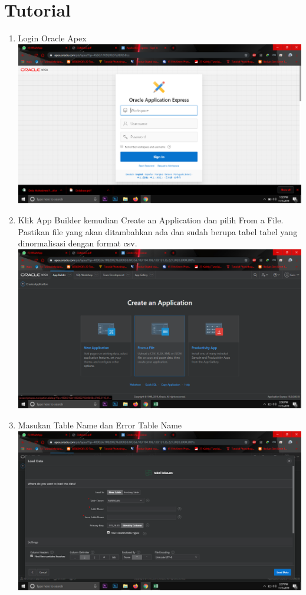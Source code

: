\clearpage
\setcounter{page}{1}

\section{Tutorial}

\begin{enumerate}

\item Login Oracle Apex\\
\includegraphics[scale = 0.3]{gambar/1.png}

\item Klik App Builder kemudian Create an Application dan pilih From a File. Pastikan file yang akan ditambahkan ada dan sudah berupa tabel tabel yang dinormalisasi dengan format csv. \\
\includegraphics[scale = 0.3]{gambar/2.png}

\item Masukan Table Name dan Error Table Name\\
\includegraphics[scale = 0.3]{gambar/3.png}


\end{enumerate}
